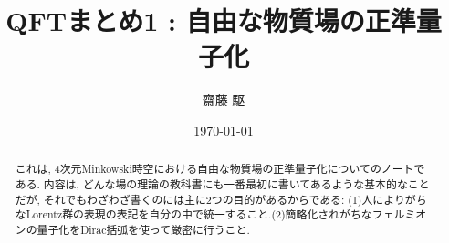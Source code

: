 \documentclass[uplatex,dvipdfmx]{jsarticle}
\title{QFTまとめ1 : 自由な物質場の正準量子化}
\author{齋藤 駆}
\date{\today}
\begin{document}
\maketitle
\thispagestyle{empty}
\begin{abstract}
    これは, 4次元Minkowski時空における自由な物質場の正準量子化についてのノートである.
    内容は, どんな場の理論の教科書にも一番最初に書いてあるような基本的なことだが, それでもわざわざ書くのには主に2つの目的があるからである:
    (1)人によりがちなLorentz群の表現の表記を自分の中で統一すること.(2)簡略化されがちなフェルミオンの量子化をDirac括弧を使って厳密に行うこと.
\end{abstract}
\tableofcontents
\clearpage

\end{document}
